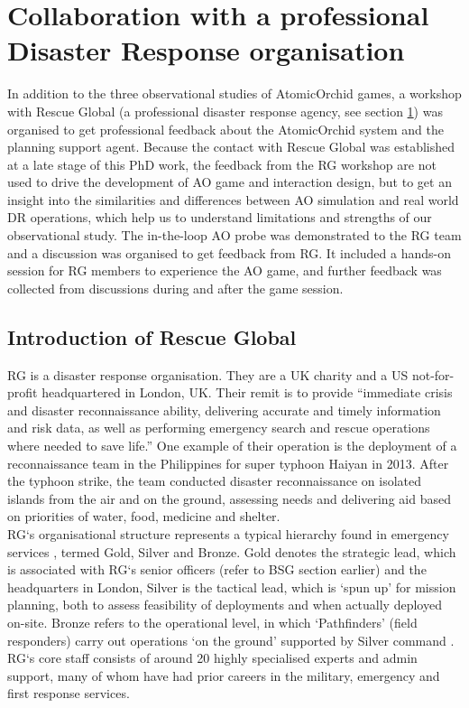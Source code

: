 \section{Collaboration with a professional Disaster Response organisation}\label{sec:rg}
In addition to the three observational studies of AtomicOrchid games, a workshop with Rescue Global (a professional disaster response agency, see section \ref{sec:rg}) was organised to get professional feedback about the AtomicOrchid system and the planning support agent. Because the contact with Rescue Global was established at a late stage of this PhD work, the feedback from the \ac{RG} workshop are not used to drive the development of \ac{AO} game and interaction design, but to get an insight into the similarities and differences between \ac{AO} simulation and real world \ac{DR} operations, which help us to understand limitations and strengths of our observational study. The in-the-loop \ac{AO} probe was demonstrated to the \ac{RG} team and a discussion was organised to get feedback from \ac{RG}. It included a hands-on session for \ac{RG} members to experience the \ac{AO} game, and further feedback was collected from discussions during and after the game session.\\

\subsection{Introduction of Rescue Global}
\acf{RG} is a disaster response organisation. They are a UK charity and a US not-for-profit headquartered in London, UK. Their remit is to provide ``immediate crisis and disaster reconnaissance ability, delivering accurate and timely information and risk data, as well as performing emergency search and rescue operations where needed to save life.'' One example of their operation is the deployment of a reconnaissance team in the Philippines for super typhoon Haiyan in 2013. After the typhoon strike, the team conducted disaster reconnaissance on isolated islands from the air and on the ground, assessing needs and delivering aid based on priorities of water, food, medicine and shelter.\\

\ac{RG}`s organisational structure represents a typical hierarchy found in emergency services \citep{U.S.DepartmentofHomelandSecurity2008}, termed Gold, Silver and Bronze. Gold denotes the strategic lead, which is associated with \ac{RG}`s senior officers (refer to BSG section earlier) and the headquarters in London, Silver is the tactical lead, which is `spun up' for mission planning, both to assess feasibility of deployments and when actually deployed on-site. Bronze refers to the operational level, in which `Pathfinders' (field responders) carry out operations `on the ground' supported by Silver command \citep{RescueGlobal2012}. \ac{RG}`s core staff consists of around 20 highly specialised experts and admin support, many of whom have had prior careers in the military, emergency and first response services.\\

